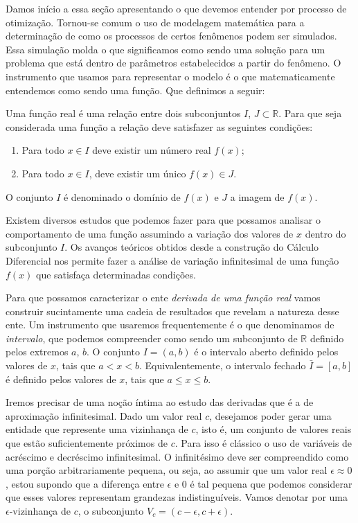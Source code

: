 \par Damos início a essa seção apresentando o que devemos entender por processo de otimização. Tornou-se comum o uso de modelagem matemática para a determinação de como os processos de certos fenômenos podem ser simulados. Essa simulação molda o que significamos como sendo uma solução para um problema que está dentro de parâmetros estabelecidos a partir do fenômeno. O instrumento que usamos para representar o modelo é o que matematicamente entendemos como sendo uma função. Que definimos a seguir:

\begin{definition}
  Uma função real é uma relação entre dois subconjuntos $I$, $J \subset \mathbb{R}$. Para que seja considerada uma função a relação deve satisfazer as seguintes condições:				
  \begin{enumerate}
  \item Para todo $x \in I$ deve existir um número real $f(x)$;
  \item Para todo $x \in I$, deve existir um único $f(x) \in J$.
  \end{enumerate}
  O conjunto $I$ é denominado o domínio de $f(x)$ e $J$ a imagem de $f(x)$.
\end{definition}


\par Existem diversos estudos que podemos fazer para que possamos analisar o comportamento de uma função assumindo a variação dos valores de $x$ dentro do subconjunto $I$. Os avanços teóricos obtidos desde a construção do Cálculo Diferencial nos permite fazer a análise de variação infinitesimal de uma função $f(x)$ que satisfaça determinadas condições. 

\par Para que possamos caracterizar o ente \textit{derivada de uma função real } vamos construir sucintamente uma cadeia de resultados que revelam a natureza desse ente. Um instrumento que usaremos frequentemente é o que denominamos de \textit{intervalo}, que podemos compreender como sendo um subconjunto de $\mathbb{R}$ definido pelos extremos $a$, $b$. O conjunto $I = (a,b)$ é o intervalo aberto definido pelos valores de $x$, tais que $ a < x < b$. Equivalentemente, o intervalo fechado $\bar{I}= [a,b]$ é definido pelos valores de $x$, tais que $a \leq x \leq b$. 

\par Iremos precisar de uma noção íntima ao estudo das derivadas que é a de aproximação infinitesimal. Dado um valor real $c$, desejamos poder gerar uma entidade que represente uma vizinhança de $c$, isto é, um conjunto de valores reais que estão suficientemente próximos de $c$. Para isso é clássico o uso de variáveis de acréscimo e decréscimo infinitesimal. O infinitésimo deve ser compreendido como uma porção arbitrariamente pequena, ou seja, ao assumir que um valor real $\epsilon \approx 0$, estou supondo que a diferença entre $\epsilon$ e $0$ é tal pequena que podemos considerar que esses valores representam grandezas indistinguíveis. Vamos denotar por uma $\epsilon$-vizinhança de $c$, o subconjunto $V_{c} = (c-\epsilon, c+ \epsilon)$. 

